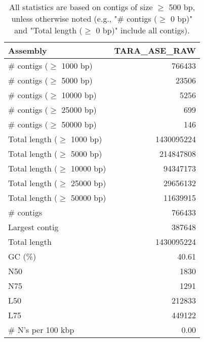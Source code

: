 \documentclass[12pt,a4paper]{article}
\begin{document}
\begin{table}[ht]
\begin{center}
\caption{All statistics are based on contigs of size $\geq$ 500 bp, unless otherwise noted (e.g., "\# contigs ($\geq$ 0 bp)" and "Total length ($\geq$ 0 bp)" include all contigs).}
\begin{tabular}{|l*{1}{|r}|}
\hline
Assembly & TARA\_ASE\_RAW \\ \hline
\# contigs ($\geq$ 1000 bp) & 766433 \\ \hline
\# contigs ($\geq$ 5000 bp) & 23506 \\ \hline
\# contigs ($\geq$ 10000 bp) & 5256 \\ \hline
\# contigs ($\geq$ 25000 bp) & 699 \\ \hline
\# contigs ($\geq$ 50000 bp) & 146 \\ \hline
Total length ($\geq$ 1000 bp) & 1430095224 \\ \hline
Total length ($\geq$ 5000 bp) & 214847808 \\ \hline
Total length ($\geq$ 10000 bp) & 94347173 \\ \hline
Total length ($\geq$ 25000 bp) & 29656132 \\ \hline
Total length ($\geq$ 50000 bp) & 11639915 \\ \hline
\# contigs & 766433 \\ \hline
Largest contig & 387648 \\ \hline
Total length & 1430095224 \\ \hline
GC (\%) & 40.61 \\ \hline
N50 & 1830 \\ \hline
N75 & 1291 \\ \hline
L50 & 212833 \\ \hline
L75 & 449122 \\ \hline
\# N's per 100 kbp & 0.00 \\ \hline
\end{tabular}
\end{center}
\end{table}
\end{document}

